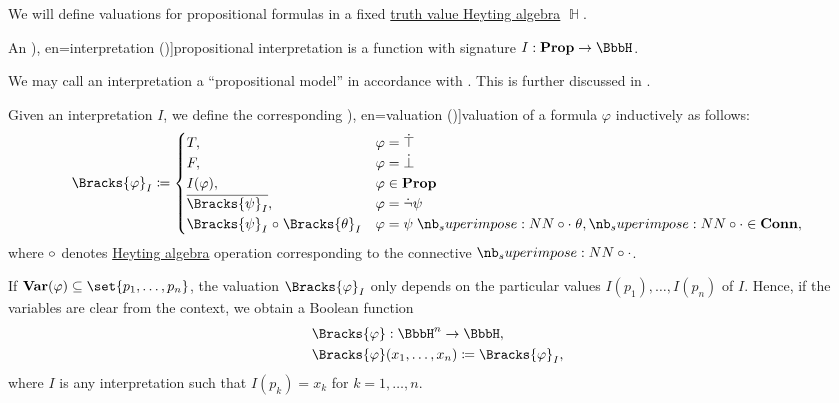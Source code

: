 \begin{definition}\label{def:propositional_valuation}\mimprovised
  We will define valuations for propositional formulas in a fixed \hyperref[def:truth_value_algebra]{truth value Heyting algebra} \( \BbbH \).

  \begin{thmenum}
     An \term[ru=интерпретация (\cite[17]{Герасимов2011}), en=interpretation (\cite[10]{Smullyan1995})]{propositional interpretation} is a function with signature \( I: \op*{Prop} \to \BbbH \).

    We may call an interpretation a \enquote{propositional model} in accordance with . This is further discussed in .

     Given an interpretation \( I \), we define the corresponding \term[ru=значение истинности (формулы) (\cite[8]{Эдельман1975}), en=valuation (\cite[10]{Smullyan1995})]{valuation} of a formula \( \varphi \) inductively as follows:
    \begin{equation}\label{eq:def:propositional_valuation/formula_valuation}
      \Bracks{\varphi}_I \coloneqq \begin{cases}
        T,                                         &\varphi = \syntop \\
        F,                                         &\varphi = \synbot \\
        I(\varphi),                                &\varphi \in \op*{Prop} \\
        \oline{\Bracks{\psi}_I},                   &\varphi = \synneg \psi \\
        \Bracks{\psi}_I \relcirc \Bracks{\theta}_I &\varphi = \psi \syncirc \theta, {\syncirc} \in \op*{Conn},
      \end{cases}
    \end{equation}
    where \( \relcirc \) denotes \hyperref[def:heyting_algebra]{Heyting algebra} operation corresponding to the connective \( \syncirc \).

     If \( \op*{Var}(\varphi) \subseteq \set{ p_1, \ldots, p_n } \), the valuation \( \Bracks{\varphi}_I \) only depends on the particular values \( I(p_1), \ldots, I(p_n) \) of \( I \). Hence, if the variables are clear from the context, we obtain a Boolean function
    \begin{equation*}
      \begin{aligned}
        &\Bracks{\varphi}: \BbbH^n \to \BbbH, \\
        &\Bracks{\varphi}(x_1, \ldots, x_n) \coloneqq \Bracks{\varphi}_I,
      \end{aligned}
    \end{equation*}
    where \( I \) is any interpretation such that \( I(p_k) = x_k \) for \( k = 1, \ldots, n \).


\end{thmenum}
\end{definition}
